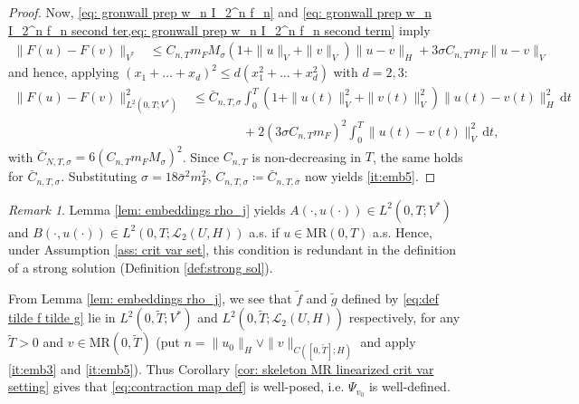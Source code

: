 \documentclass{amsart}
\newcommand{\dd}{\,\mathrm{d}}
\renewcommand{\MR}{\mathrm{MR}}
\newcommand{\UH}{\mathcal{L}_2(U,H)}
\newcommand{\<}{\langle}
\newcommand{\?}{\rangle}
\theoremstyle{plain}
\theoremstyle{remark}
\newtheorem{remark}[theorem]{Remark}
\theoremstyle{plain}
\numberwithin{equation}{section}
\begin{document}
\begin{proof}
Now, \eqref{eq: gronwall prep w_n I_2^n f_n} and \eqref{eq: gronwall prep w_n I_2^n f_n second ter,eq: gronwall prep w_n I_2^n f_n second term} imply
\begin{align*}
\|F(u)-F(v)\|_{V^*}&\leq C_{n,T}m_F M_{\sigma}(1+\|u\|_V+\|v\|_V)\|u-v\|_{H}+3\sigma C_{n,T}m_F \|u-v\|_V
\end{align*}
and hence, applying $(x_1+\ldots+x_d)^2\leq d(x_1^2+\ldots+x_d^2)$ with $d=2,3$:
\begin{align*}
  \|F(u)-F(v)\|_{L^2(0,T;V^*)}^2&\leq \bar{C}_{n,T,\sigma}\int_0^T(1+\|u(t)\|_V^2+\|v(t)\|_V^2)\|u(t)-v(t)\|_{H}^2\dd t\\
  &\qquad\qquad+2(3\sigma C_{n,T}m_F)^2 \int_0^T\|u(t)-v(t)\|_V^2\dd t,
\end{align*}
with $\bar{C}_{N,T,\sigma}=6(C_{n,T}m_F M_{\sigma})^2$. Since $C_{n,T}$ is non-decreasing in $T$, the same holds for $\bar{C}_{n,T,\sigma}$.
Substituting $\sigma=18\bar{\sigma}^2 m_F^2$, ${C}_{n,T,\sigma}\coloneqq \bar{C}_{n,T,\bar{\sigma}}$ now yields \ref{it:emb5}.
\end{proof}


\begin{remark}
Lemma \ref{lem: embeddings rho_j} yields $A(\cdot,u(\cdot))\in L^2(0,T;V^*)$ and $B(\cdot,u(\cdot))\in L^2(0,T;\UH)$  a.s. \!if $u\in \MR(0,T)$ a.s. Hence, under Assumption \ref{ass: crit var set}, this condition is redundant in the definition of a strong solution (Definition \ref{def:strong sol}).
\end{remark}

From Lemma \ref{lem: embeddings rho_j}, we see  that $\tilde{f}$ and $\tilde{g}$ defined by \eqref{eq:def tilde f tilde g} lie in $L^2(0,\tilde{T};V^*)$ and $L^2(0,\tilde{T};\UH)$ respectively,
for any $\tilde{T}>0$ and $v\in\MR(0,\tilde{T})$ (put $n=\|u_0\|_{H}\vee\|v\|_{C([0,\tilde{T}];H)}$ and apply \ref{it:emb3} and \ref{it:emb5}). Thus Corollary \ref{cor: skeleton MR linearized crit var setting} gives that \eqref{eq:contraction map def} is well-posed, i.e. $\Psi_{v_0}$ is well-defined.
\end{document}
